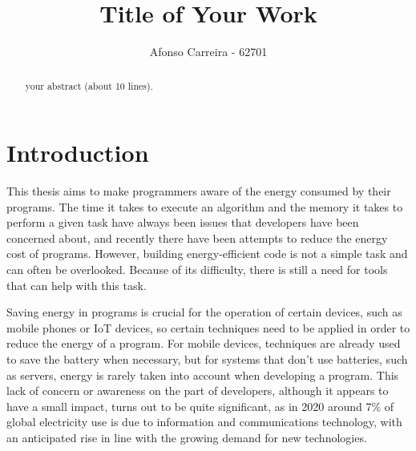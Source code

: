 \documentclass[sigplan]{acmart}
\begin{document}
\title{Title of Your Work}

\author{Afonso Carreira - 62701}


\begin{abstract}
  your abstract (about 10 lines).
\end{abstract}



\pagestyle{plain} %

\maketitle
\section{Introduction}

This thesis aims to make programmers aware of the energy consumed by their programs. The time it takes to execute an algorithm and the memory it takes to perform a given task have always been issues that developers have been concerned about, and recently there have been attempts to reduce the energy cost of programs. However, building energy-efficient code is not a simple task and can often be overlooked. Because of its difficulty, there is still a need for tools that can help with this task\cite{10.1145/2597073.2597110}. 


Saving energy in programs is crucial for the operation of certain devices, such as mobile phones or IoT devices, so certain techniques need to be applied in order to reduce the energy of a program. For mobile devices, techniques are already used to save the battery when necessary, but for systems that don't use batteries, such as servers, energy is rarely taken into account when developing a program.
This lack of concern or awareness on the part of developers, although it appears to have a small impact, turns out to be quite significant, as in 2020 around 7\% of global electricity use is due to information and communications technology, with an anticipated rise in line with the growing demand for new technologies\cite{article}. 
\end{document}

